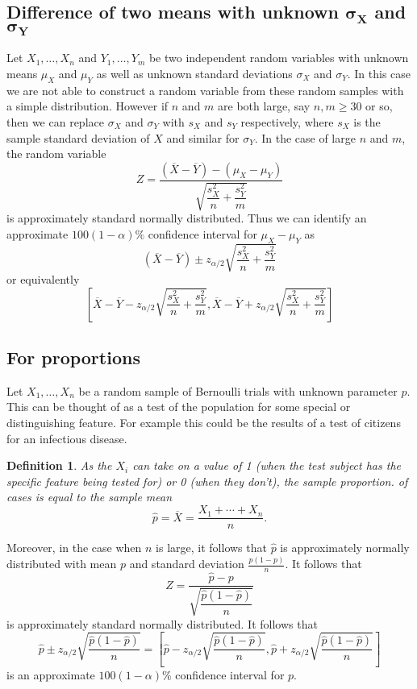 \documentclass[1pt]{report}
\newtheorem{defn}[thm]{Definition}
\newcommand{\<}{\langle}
\renewcommand{\>}{\rangle}
\renewcommand{\bar}{\overline}
\begin{document}
\subsection{Difference of two means with unknown $\boldsymbol{\sigma_X}$ and $\boldsymbol{\sigma_Y}$}
Let $X_1, \dots, X_n$ and $Y_1, \dots, Y_m$ be two independent random variables with unknown means $\mu_X$ and $\mu_Y$ as well as unknown standard deviations $\sigma_X$ and $\sigma_Y$. In this case we are not able to construct a random variable from these random samples with a simple distribution. However if $n$ and $m$ are both large, say $n,m \geq 30$ or so, then we can replace $\sigma_X$ and $\sigma_Y$ with $s_X$ and $s_Y$ respectively,  where $s_X$ is the sample standard deviation of $X$ and similar for $\sigma_Y$. In the case of large $n$ and $m$, the random variable
$$ Z = \dfrac{(\bar X - \bar Y) - (\mu_X - \mu_Y)}{\sqrt{\dfrac{s_X^2}{n} + \dfrac{s_Y^2}{m}}}$$
is approximately standard normally distributed. Thus we can identify an approximate $100(1-\alpha)\%$ confidence interval for $\mu_X - \mu_Y$ as
$$(\bar X - \bar Y) \pm z_{\alpha/2} \sqrt{\frac{s_X^2}{n} + \frac{s_Y^2}{m}}$$
or equivalently
$$\left[ \bar X - \bar Y - z_{\alpha/2} \sqrt{\frac{s_X^2}{n} + \frac{s_Y^2}{m}} , \bar X - \bar Y + z_{\alpha/2} \sqrt{\frac{s_X^2}{n} + \frac{s_Y^2}{m}}\right]$$
\subsection{For proportions}
Let $X_1, \dots , X_n$ be a random sample of Bernoulli trials with unknown parameter $p$. This can be thought of as a test of the population for some special or distinguishing feature. For example this could be the results of a test of citizens for an infectious disease.
\begin{defn}\label{def:sampleproportion}
As the $X_i$ can take on a value of 1 (when the test subject has the specific feature being tested for) or 0 (when they don't), the \emph{sample proportion}. of cases is equal to the sample mean
$$\hat p = \bar X = \dfrac{X_1 + \cdots + X_n}{n}.$$
\end{defn}
Moreover, in the case when $n$ is large, it follows that $\hat p$ is approximately normally distributed with mean $p$ and standard deviation $\frac{p(1-p)}{n}$. It follows that
$$ Z = \dfrac{ \hat p - p}{\sqrt{\dfrac{\hat p ( 1 - \hat p)}{n}}}$$
is approximately standard normally distributed. It follows that 
$$\hat p \pm z_{\alpha/2}\sqrt{\dfrac{\hat p (1- \hat p)}{n}} = \left[\hat p - z_{\alpha/2}\sqrt{\dfrac{\hat p(1-\hat p)}{n}} , \hat p + z_{\alpha/2} \sqrt{\dfrac{\hat p (1-\hat p)}{n}}\right]$$
is an approximate $100(1-\alpha)\%$ confidence interval for $p$.
\end{document}
